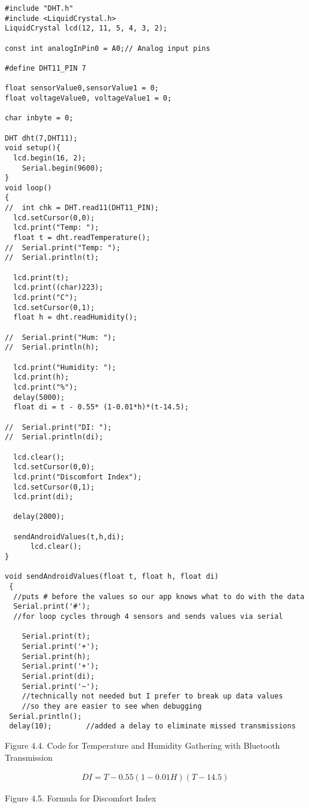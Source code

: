 \begin{lstlisting}
#include "DHT.h"
#include <LiquidCrystal.h>
LiquidCrystal lcd(12, 11, 5, 4, 3, 2);

const int analogInPin0 = A0;// Analog input pins

#define DHT11_PIN 7

float sensorValue0,sensorValue1 = 0;
float voltageValue0, voltageValue1 = 0;

char inbyte = 0;

DHT dht(7,DHT11);
void setup(){
  lcd.begin(16, 2);
    Serial.begin(9600);
}
void loop()
{
//  int chk = DHT.read11(DHT11_PIN);
  lcd.setCursor(0,0); 
  lcd.print("Temp: ");
  float t = dht.readTemperature();
//  Serial.print("Temp: ");
//  Serial.println(t);
  
  lcd.print(t);
  lcd.print((char)223);
  lcd.print("C");
  lcd.setCursor(0,1);
  float h = dht.readHumidity();

//  Serial.print("Hum: ");
//  Serial.println(h);
  
  lcd.print("Humidity: ");
  lcd.print(h);
  lcd.print("%");
  delay(5000);
  float di = t - 0.55* (1-0.01*h)*(t-14.5);

//  Serial.print("DI: ");
//  Serial.println(di);

  lcd.clear();
  lcd.setCursor(0,0);
  lcd.print("Discomfort Index");
  lcd.setCursor(0,1);
  lcd.print(di);

  delay(2000);
  
  sendAndroidValues(t,h,di);
      lcd.clear();
}

void sendAndroidValues(float t, float h, float di)
 {
  //puts # before the values so our app knows what to do with the data
  Serial.print('#');
  //for loop cycles through 4 sensors and sends values via serial
  
    Serial.print(t);
    Serial.print('+');
    Serial.print(h);
    Serial.print('+');
    Serial.print(di);
    Serial.print('~');
    //technically not needed but I prefer to break up data values
    //so they are easier to see when debugging
 Serial.println();
 delay(10);        //added a delay to eliminate missed transmissions

\end{lstlisting}

\begin{center}
Figure 4.4. Code for Temperature and Humidity Gathering with Bluetooth Transmission
\end{center}
\begin{center}
\begin{eqnarray}
DI = T-0.55(1-0.01H)(T-14.5)
\label{Discomfort Index}
\end{eqnarray}
\end{center}
\begin{center}
Figure 4.5. Formula for Discomfort Index
\end{center}

